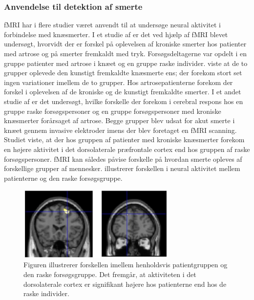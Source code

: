 \subsubsection{Anvendelse til detektion af smerte}
fMRI har i flere studier været anvendt til at undersøge neural aktivitet i forbindelse med knæsmerter.
I et studie af \citep{Parks2012} er det ved hjælp af fMRI blevet undersøgt, hvorvidt der er forskel på oplevelsen af kroniske smerter hos patienter med artrose og på smerter fremkaldt med tryk. Forsøgsdeltagerne var opdelt i en gruppe patienter med artrose i knæet og en gruppe raske individer. \cite{Parks2012} viste at de to grupper oplevede den kunstigt fremkaldte knæsmerte ens; der forekom stort set ingen variationer imellem de to grupper. Hos artrosepatienterne forekom der forskel i oplevelsen af de kroniske og de kunstigt fremkaldte smerter. \citep{Parks2012} 
I et andet studie af \cite{Hiramatsu2014} er det undersøgt, hvilke forskelle der forekom i cerebral respons hos en gruppe raske forsøgspersoner og en gruppe forsøgspersoner med kroniske knæsmerter forårsaget af artrose. Begge grupper blev udsat for akut smerte i knæet gennem invasive elektroder imens der blev foretaget en fMRI scanning. Studiet viste, at der hos gruppen af patienter med kroniske knæsmerter forekom en højere aktivitet i det dorsolaterale præfrontale cortex end hos gruppen af raske forsøgspersoner. \citep{Hiramatsu2014} 
fMRI kan således påvise forskelle på hvordan smerte opleves af forskellige grupper af mennesker.  illustrerer forskellen i neural aktivitet mellem patienterne og den raske forsøgsgruppe.
\begin{figure}[H] 
	\begin{center}
		\includegraphics[width=0.7\textwidth]{figures/bProblemanalyse/fMRI_dorsolateral}
	\end{center}
	\caption{Figuren illustrerer forskellen imellem henholdsvis patientgruppen og den raske forsøgsgruppe. Det fremgår, at aktiviteten i det dorsolaterale cortex er signifikant højere hos patienterne end hos de raske individer. \citep{Hiramatsu2014}} 
	\label{fig:fMRI_result} 
\end{figure} 


